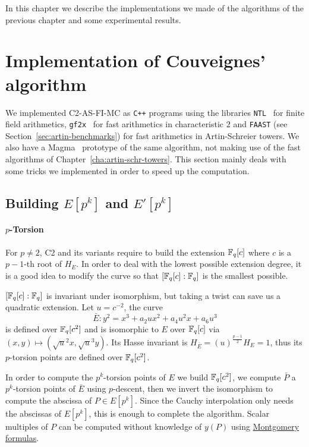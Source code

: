 In this chapter we describe the implementations we made of the
algorithms of the previous chapter and some experimental results.

\section{Implementation of Couveignes' algorithm}
\label{sec:implementation}

We implemented C2-AS-FI-MC as \texttt{C++} programs using the
libraries \texttt{NTL}~\cite{shoup2003ntl} for finite field
arithmetics, \texttt{gf2x}~\cite{gf2x} for fast arithmetics in
characteristic $2$ and \texttt{FAAST} (see
Section~\ref{sec:artin-benchmarks}) for fast arithmetics in
Artin-Schreier towers.  We also have a Magma~\cite{MAGMA} prototype of
the same algorithm, not making use of the fast algorithms of
Chapter~\ref{cha:artin-schr-towers}.  This section mainly deals with
some tricks we implemented in order to speed up the computation.

\subsection{Building \texorpdfstring{$E[p^k]$}{E[pk]} and \texorpdfstring{$E'[p^k]$}{E[pk]}}
\label{sec:impl:torsion}

\paragraph{$p$-Torsion}
For $p\ne2$, C2 and its variants require to build the extension
$\mathbb{F}_q[c]$ where $c$ is a $p-1$-th root of $H_E$. In order to deal with
the lowest possible extension degree, it is a good idea to modify the
curve so that $[\mathbb{F}_q[c]:\mathbb{F}_q]$ is the smallest possible.

$[\mathbb{F}_q[c]:\mathbb{F}_q]$ is invariant under isomorphism, but taking a twist
can save us a quadratic extension. Let $u=c^{-2}$, the curve
\begin{equation*}
  \bar{E} : y^2 = x^3 + a_2ux^2 + a_4u^2x + a_6u^3
\end{equation*}
is defined over $\mathbb{F}_q[c^2]$ and is isomorphic to $E$ over $\mathbb{F}_q[c]$
via $(x,y)\mapsto(\sqrt{u}^2x,\sqrt{u}^3y)$. Its Hasse invariant is
$H_{\bar{E}} = (u)^{\frac{p-1}{2}}H_E = 1$, thus its $p$-torsion
points are defined over $\mathbb{F}_q[c^2]$.

In order to compute the $p^k$-torsion points of $E$ we build
$\mathbb{F}_q[c^2]$, we compute $\bar{P}$ a $p^k$-torsion points of $\bar{E}$
using $p$-descent, then we invert the isomorphism to compute the
abscissa of $P\in E[p^k]$. Since the Cauchy interpolation only needs
the abscissas of $E[p^k]$, this is enough to complete the
algorithm. Scalar multiples of $P$ can be computed without knowledge
of $y(P)$ using \hyperref[rk:montgomery]{Montgomery formulas}.

